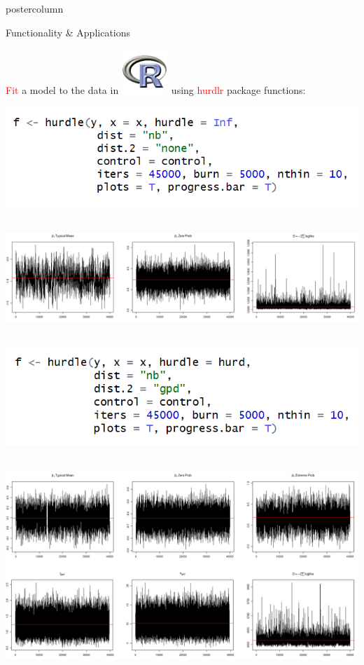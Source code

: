 \documentclass[final]{beamer}\usepackage[]{graphicx}\usepackage[]{color}
\newcommand{\red}{\textcolor{red}}
\begin{document}
{\begin{frame}
\begin{columns}
\begin{column}{.33\textwidth}
\begin{beamercolorbox}[center,wd=\textwidth]{postercolumn}
\begin{minipage}[T]{.97\textwidth}
{\begin{block}{Functionality \& Applications}
\begin{minipage}[t][0.01mm]{.97\textwidth}
	\red{Fit} a model to the data in \includegraphics[scale=.55]{miscPP.png}\ using \red{hurdlr} package functions:
\end{minipage}

\vspace{1cm}
	
\includegraphics[scale=1.4]{code2.png}\ \

\vspace{0.4cm}

\includegraphics[scale=0.8]{plots2.png}\ \

\vspace{1.2cm}

\includegraphics[scale=1.4]{code1.png}\ \

\vspace{0.6cm}

\includegraphics[scale=0.8]{plots4.png}\ \


\end{block}}
\end{minipage}
\end{beamercolorbox}
\end{column}
\end{columns}
\end{frame}}
\end{document}
